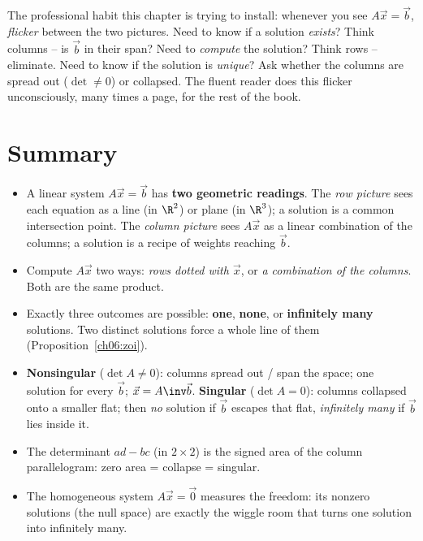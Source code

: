 \begin{remark}
The professional habit this chapter is trying to install: whenever you see
$A\vec x=\vec b$, \emph{flicker} between the two pictures. Need to know if a
solution \emph{exists}? Think columns -- is $\vec b$ in their span? Need to
\emph{compute} the solution? Think rows -- eliminate. Need to know if the
solution is \emph{unique}? Ask whether the columns are spread out
($\det\neq0$) or collapsed. The fluent reader does this flicker
unconsciously, many times a page, for the rest of the book.
\end{remark}

\section{Summary}

\begin{itemize}
  \item A linear system $A\vec x=\vec b$ has \textbf{two geometric readings}.
  The \emph{row picture} sees each equation as a line (in $\R^2$) or plane
  (in $\R^3$); a solution is a common intersection point. The \emph{column
  picture} sees $A\vec x$ as a linear combination of the columns; a solution
  is a recipe of weights reaching $\vec b$.
  \item Compute $A\vec x$ two ways: \emph{rows dotted with $\vec x$}, or
  \emph{a combination of the columns}. Both are the same product.
  \item Exactly three outcomes are possible: \textbf{one}, \textbf{none}, or
  \textbf{infinitely many} solutions. Two distinct solutions force a whole
  line of them (Proposition~\ref{ch06:zoi}).
  \item \textbf{Nonsingular} ($\det A\neq0$): columns spread out / span the
  space; one solution for every $\vec b$; $\vec x=A\inv\vec b$.
  \textbf{Singular} ($\det A=0$): columns collapsed onto a smaller flat;
  then \emph{no} solution if $\vec b$ escapes that flat, \emph{infinitely
  many} if $\vec b$ lies inside it.
  \item The determinant $ad-bc$ (in $2\times2$) is the signed area of the
  column parallelogram: zero area = collapse = singular.
  \item The homogeneous system $A\vec x=\vec0$ measures the freedom: its
  nonzero solutions (the null space) are exactly the wiggle room that turns
  one solution into infinitely many.
\end{itemize}

